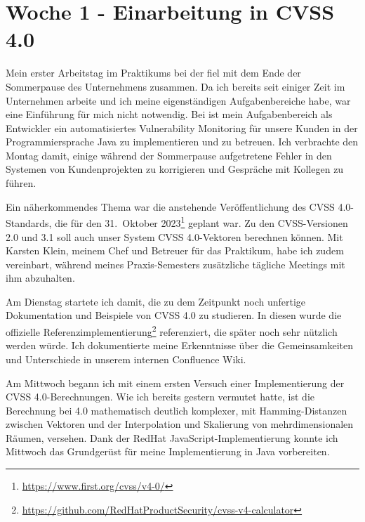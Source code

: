\section{Woche 1 - Einarbeitung in CVSS 4.0} \label{sec:bericht-wo-1}


\lweekdaymarginpar{\weekdayMondayLong}

Mein erster Arbeitstag im Praktikums bei der {\metaeffekt} fiel mit dem Ende der Sommerpause des Unternehmens zusammen.
Da ich bereits seit einiger Zeit im Unternehmen arbeite und ich meine eigenständigen Aufgabenbereiche habe, war eine Einführung für mich nicht notwendig.
Bei {\metaeffekt} ist mein Aufgabenbereich als Entwickler ein automatisiertes Vulnerability Monitoring für unsere Kunden in der Programmiersprache Java zu implementieren und zu betreuen.
Ich verbrachte den Montag damit, einige während der Sommerpause aufgetretene Fehler in den Systemen von Kundenprojekten zu korrigieren und Gespräche mit Kollegen zu führen.

Ein näherkommendes Thema war die anstehende Veröffentlichung des CVSS 4.0-Standards, die für den 31.\ Oktober 2023\footnote{\url{https://www.first.org/cvss/v4-0/}} geplant war.
Zu den CVSS-Versionen 2.0 und 3.1 soll auch unser System CVSS 4.0-Vektoren berechnen können.
Mit Karsten Klein, meinem Chef und Betreuer für das Praktikum, habe ich zudem vereinbart, während meines Praxis-Semesters zusätzliche tägliche Meetings mit ihm abzuhalten.

\sweekdaymarginpar{\weekdayTuesdayLong}

Am Dienstag startete ich damit, die zu dem Zeitpunkt noch unfertige Dokumentation und Beispiele von CVSS 4.0 zu studieren.
In diesen wurde die offizielle Referenzimplementierung\footnote{\url{https://github.com/RedHatProductSecurity/cvss-v4-calculator}} referenziert, die später noch sehr nützlich werden würde.
Ich dokumentierte meine Erkenntnisse über die Gemeinsamkeiten und Unterschiede in unserem internen Confluence Wiki.

\sweekdaymarginpar{\weekdayWednesdayLong}

Am Mittwoch begann ich mit einem ersten Versuch einer Implementierung der CVSS 4.0-Berechnungen.
Wie ich bereits gestern vermutet hatte, ist die Berechnung bei 4.0 mathematisch deutlich komplexer, mit Hamming-Distanzen zwischen Vektoren und der Interpolation und Skalierung von mehrdimensionalen Räumen, versehen.
Dank der RedHat JavaScript-Implementierung konnte ich Mittwoch das Grundgerüst für meine Implementierung in Java vorbereiten.

